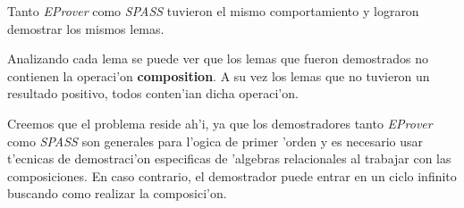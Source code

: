 Tanto \textit{EProver} como \textit{SPASS} tuvieron el mismo comportamiento y lograron demostrar los mismos lemas.

Analizando cada lema se puede ver que los lemas que fueron demostrados no contienen la operaci'on \textbf{composition}. A su vez los lemas que no tuvieron un resultado positivo, todos conten'ian dicha operaci'on. 

Creemos que el problema reside ah'i, ya que los demostradores tanto \textit{EProver} como  \textit{SPASS} son generales para l'ogica de primer 'orden y es necesario usar t'ecnicas de demostraci'on especificas de 'algebras relacionales al trabajar con las composiciones. En caso contrario, el demostrador puede entrar en un ciclo infinito buscando como realizar la composici'on.


